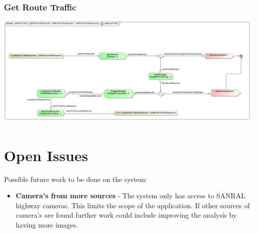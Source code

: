 \documentclass[a4paper,12pt]{article}
\begin{document}
\subsubsection{Get Route Traffic}
\includegraphics[width=\textwidth]{images/ps_GetRouteTraffic.jpg}

\section{Open Issues}
Possible future work to be done on the system:
\begin{itemize}
\item \textbf{Camera's from more sources} - The system only has access to SANRAL highway cameras. This limits the scope of the application. If other sources of camera's are found further work could include improving the analysis by having more images.
\end{itemize}
\end{document}
